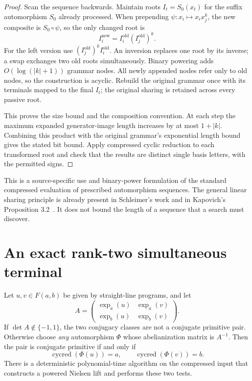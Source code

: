 \begin{proof}
Scan the sequence backwards.  Maintain roots $I_t=S_0(x_t)$ for the suffix
automorphism $S_0$ already processed.  When prepending
$\psi:x_i\mapsto x_i x_j^k$, the new composite is $S_0\circ\psi$, so
the only changed root is
\[
 I_i^{\mathrm{new}}=I_i^{\mathrm{old}}
                      (I_j^{\mathrm{old}})^k.
\]
For the left version use $(I_j^{\mathrm{old}})^kI_i^{\mathrm{old}}$.
An inversion replaces one root by its inverse; a swap exchanges two old
roots simultaneously.  Binary powering adds $O(\log(|k|+1))$ grammar nodes.
All newly appended nodes refer only to old nodes, so the construction is
acyclic.  Rebuild the original grammar once with its terminals mapped to
the final $I_t$; the original sharing is retained across every passive root.

This proves the size bound and the composition convention.  At each step
the maximum expanded generator-image length increases by at most
$1+|k|$.  Combining this product with the original grammar's exponential
length bound gives the stated bit bound.  Apply compressed cyclic reduction
to each transformed root and check that the results are distinct single
basis letters, with the permitted signs.
\end{proof}

This is a source-specific use and binary-power formulation of the standard
compressed evaluation of prescribed automorphism sequences.  The general
linear sharing principle is already present in Schleimer's work and in
Kapovich's Proposition 3.2~\cite{kapovich2026}.  It does not bound the length of a sequence that
a search must discover.

\section{An exact rank-two simultaneous terminal}
\label{sec:ranktwo}

\begin{theorem}
\label{thm:pair}
Let $u,v\in F(a,b)$ be given by straight-line programs, and let
\[
 A=\begin{pmatrix}\operatorname{exp}_a(u)&\operatorname{exp}_a(v)\\
                   \operatorname{exp}_b(u)&\operatorname{exp}_b(v)
   \end{pmatrix}.
\]
If $\det A\notin\{-1,1\}$, the two conjugacy classes are not a
conjugate primitive pair.  Otherwise choose \emph{any} automorphism
$\Phi$ whose abelianization matrix is $A^{-1}$.  Then the pair is conjugate
primitive if and only if
\[
 \operatorname{cycred}(\Phi(u))=a,
 \qquad
 \operatorname{cycred}(\Phi(v))=b.
\]
There is a deterministic polynomial-time algorithm on the compressed input
that constructs a powered Nielsen lift and performs these two tests.
\end{theorem}

